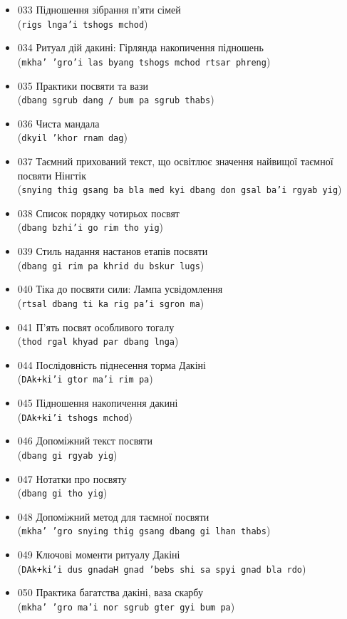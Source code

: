 \documentclass{article}
\begin{document}
\begin{itemize}
\item 033 Підношення зібрання п’яти сімей \\ (\texttt{rigs lnga'i tshogs mchod})
\item 034 Ритуал дій дакині: Гірлянда накопичення підношень \\ (\texttt{mkha' 'gro'i las byang tshogs mchod rtsar phreng})
\item 035 Практики посвяти та вази \\ (\texttt{dbang sgrub dang / bum pa sgrub thabs})
\item 036 Чиста мандала \\ (\texttt{dkyil 'khor rnam dag})
\item 037 Таємний прихований текст, що освітлює значення найвищої таємної посвяти Нінгтік \\ (\texttt{snying thig gsang ba bla med kyi dbang don gsal ba'i rgyab yig})
\item 038 Список порядку чотирьох посвят \\ (\texttt{dbang bzhi'i go rim tho yig})
\item 039 Стиль надання настанов етапів посвяти \\ (\texttt{dbang gi rim pa khrid du bskur lugs})
\item 040 Тіка до посвяти сили: Лампа усвідомлення \\ (\texttt{rtsal dbang ti ka rig pa'i sgron ma})
\item 041 П'ять посвят особливого тогалу \\ (\texttt{thod rgal khyad par dbang lnga})
\item 044 Послідовність піднесення торма Дакіні \\ (\texttt{DAk+ki'i gtor ma'i rim pa})
\item 045 Підношення накопичення дакині \\ (\texttt{DAk+ki'i tshogs mchod})
\item 046 Допоміжний текст посвяти \\ (\texttt{dbang gi rgyab yig})
\item 047 Нотатки про посвяту \\ (\texttt{dbang gi tho yig})
\item 048 Допоміжний метод для таємної посвяти \\ (\texttt{mkha' 'gro snying thig gsang dbang gi lhan thabs})
\item 049 Ключові моменти ритуалу Дакіні \\ (\texttt{DAk+ki'i dus gnadaH gnad 'bebs shi sa spyi gnad bla rdo})
\item 050 Практика багатства дакіні, ваза скарбу \\ (\texttt{mkha' 'gro ma'i nor sgrub gter gyi bum pa})

\end{itemize}
\end{document}
